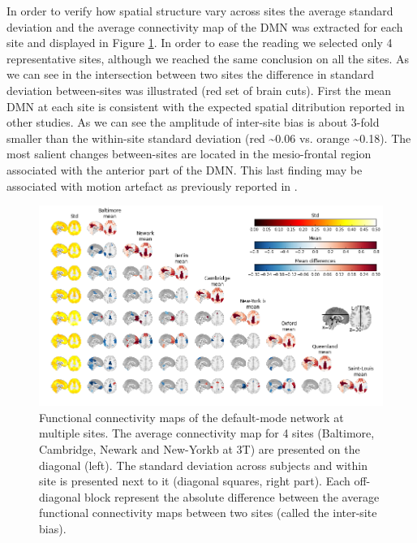 \documentclass[authoryear]{elsarticle}
\begin{document}
In order to verify how spatial structure vary across sites the average standard deviation and the average connectivity map of the DMN was extracted for each site and displayed in Figure \ref{fig_DMN_variability}. In order to ease the reading we selected only 4 representative sites, although we reached the same conclusion on all the sites. As we can see in the intersection between two sites the difference in standard deviation between-sites was illustrated (red set of brain cuts). First the mean DMN at each site is consistent with the expected spatial ditribution reported in other studies. As we can see the amplitude of inter-site bias is about 3-fold smaller than the within-site standard deviation (red \textasciitilde0.06 vs. orange \textasciitilde0.18). The most salient changes between-sites are located in the mesio-frontal region associated with the anterior part of the DMN. This last finding may be associated with motion artefact as previously reported in \cite{Dansereau2014}.



\begin{figure}[H]
\begin{center}
\includegraphics[width=\linewidth]{../figures/pccmap_multisite.png}
\end{center}
\caption[DMN variability across sites]{
Functional connectivity maps of the default-mode network at multiple sites. The average connectivity map for 4 sites (Baltimore, Cambridge, Newark and New-Yorkb at 3T) are presented on the diagonal (left). The standard deviation across subjects and within site is presented next to it (diagonal squares, right part). Each off-diagonal block represent the absolute difference between the average functional connectivity maps between two sites (called the inter-site bias).
}
\label{fig_DMN_variability}
\end{figure}
\end{document}
